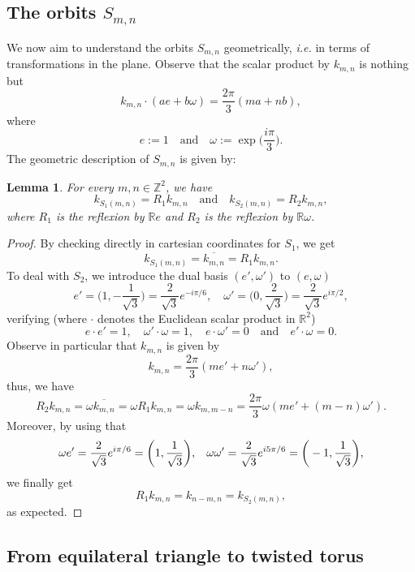 \documentclass[a4paper,11pt]{amsart}
\numberwithin{equation}{section}
\newtheorem{lem}[thm]{Lemma}
\theoremstyle{definition}
\begin{document}
\subsection{The orbits $S_{m,n}$}
We now aim to understand the orbits $S_{m,n}$ geometrically, \textit{i.e.} in terms of transformations in the plane.
Observe that the scalar product by $k_{m,n}$ is nothing but
\begin{equation}\label{eq:scalk}
    {k_{m,n} \cdot (ae + b \omega) = \frac{2\pi}{3}(ma + nb),}
\end{equation}
where
$$
e := 1 \quad\text{and}\quad \omega := \exp\bigg(\frac{i\pi}{3}\bigg).
$$
The geometric description of $S_{m,n}$ is given by:
\begin{lem}
For every $m,n\in\mathbb Z^2$, we have
\[
    k_{S_1(m,n)} = R_1 k_{m,n}\quad\text{and}\quad k_{S_2(m,n)} = R_2 k_{m,n}, 
\]
where $R_1$ is the reflexion by $\mathbb Re$ and $R_2$ is the reflexion by $\mathbb R\omega$. 
\end{lem}
\begin{proof}
By checking directly in cartesian coordinates for $S_1$, we get
$$
 k_{S_1({m,n})} = \overline{k_{m,n}} = R_1 k_{m,n}.
$$
To deal with $S_2$, we introduce the dual basis $(e',\omega')$ to $(e,\omega)$
$$
e' = \bigg(1,  - \frac{1}{\sqrt 3}\bigg) = \frac{2}{\sqrt 3}e^{-i\pi/6}, \quad \omega' = \bigg(0, \frac{2}{\sqrt 3}\bigg) =  \frac{2}{\sqrt 3} e^{i\pi/2},
$$
verifying (where $\cdot$ denotes the Euclidean scalar product in $\mathbb R^2$)
$$
e\cdot e' = 1, \quad  \omega' \cdot \omega = 1, \quad e \cdot \omega ' = 0\quad\text{and}\quad e'  \cdot \omega = 0.
$$
Observe in particular that $k_{m,n}$ is given by
$$
k_{m,n} = \frac{2 \pi}{3}(me' + n \omega'),
$$
thus, we have
$$
R_2 k_{m,n} = \omega \overline{k_{m,n}} =  
\omega
R_1 k_{m,n} =\omega k_{m,m-n} = \frac{2\pi}{3}\omega(me'+(m-n)\omega'). 
$$
Moreover, by using that
$$
\omega e' = \frac{2}{\sqrt 3} e^{i\pi/6} = \bigg(1, \frac{1}{\sqrt 3}\bigg), \hspace{0.3cm}\omega\omega' = \frac{2}{\sqrt 3}e^{i5\pi/6} = \bigg(-1, \frac{1}{\sqrt{3}}\bigg),
$$
we finally get
\[
    R_1 k_{m,n}  = k_{n-m,n} =  k_{S_2({m,n})},
\]
as expected.
\end{proof}

\subsection{From equilateral triangle to twisted torus}\label{subsec:tritotor}
\end{document}
